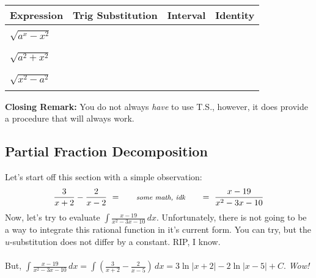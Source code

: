 \documentclass[addpoints, 12pt]{exam}
\newcommand\Tstrut{\rule{0pt}{2.6ex}}         %
\newcommand\Bstrut{\rule[-0.9ex]{0pt}{0pt}}   %
\begin{document}
\vspace{5in}

\begin{longtable}[b]{|C{3.667cm}|C{3.667cm}|C{3.667cm}|C{3.7cm}|}
    \hline
    \textbf{Expression}\Tstrut\Bstrut & \textbf{Trig Substitution}\Tstrut\Bstrut & \textbf{Interval}\Tstrut\Bstrut & \textbf{Identity}\Tstrut\Bstrut \\\hline
    & & & \\
    $\displaystyle\sqrt{a^x-x^2}$\Tstrut\Bstrut & & & \\
    & & & \\\hline
    & & & \\
    $\displaystyle\sqrt{a^2+x^2}$\Tstrut\Bstrut & & & \\
    & & & \\\hline
    & & & \\
    $\displaystyle\sqrt{x^2-a^2}$\Tstrut\Bstrut & & & \\
    & & & \\\hline
    
\end{longtable}

\textbf{Closing Remark:} You do not always \textit{have} to use T.S., however, it does provide a procedure that will always work.


\newpage
{}
\subsection*{Partial Fraction Decomposition}
Let's start off this section with a simple observation:
    \[\displaystyle\frac{3}{x+2}-\frac{2}{x-2}\,\, = \,\, \hspace{.2in}\textit{\footnotesize     some math, idk}\hspace{.2in} \,\,=\,\, \frac{x-19}{x^2-3x-10}\]
Now, let's try to evaluate $\displaystyle\int\frac{x-19}{x^2-3x-10}\,dx$. Unfortunately, there is not going to be a way to integrate this rational function in it's current form. You can try, but the $u$-substitution does not differ by a constant. RIP, I know. \\
\\
But, $\displaystyle\int\frac{x-19}{x^2-3x-10}\,dx=\int\left(\frac{3}{x+2}-\frac{2}{x-5}\right)\,dx=3\ln|x+2|-2\ln|x-5|+C$. \textit{\footnotesize Wow!}

\vspace{.25in}
\end{document}
